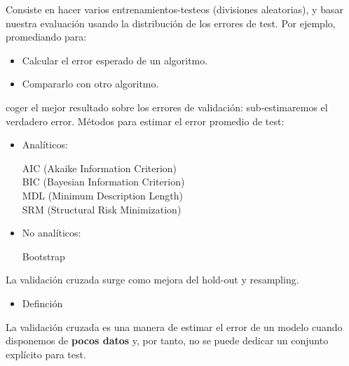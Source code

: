 Consiste en hacer varios entrenamientos-testeos (divisiones aleatorias), y basar nuestra evaluación usando la distribución de los errores de test. Por ejemplo, promediando para:
\begin{itemize}
	\item Calcular el error esperado de un algoritmo.
	\item Compararlo con otro algoritmo.
\end{itemize}
 coger el mejor resultado sobre los errores de validación: sub-estimaremos el verdadero error.
Métodos para estimar el error promedio de test:
\begin{itemize}
	\item Analíticos:
	
	AIC (Akaike Information Criterion)\\
	BIC (Bayesian Information Criterion)\\
	MDL (Minimum Description Length)\\
	SRM (Structural Risk Minimization)\\
	\item No analíticos:
	
	
	Bootstrap
\end{itemize}
La validación cruzada surge como mejora del hold-out y resampling.
\begin{itemize}[label=\color{red}\textbullet, leftmargin=*]
	\item \color{lightblue}Definción
\end{itemize}
La validación cruzada es una manera de estimar el error de un modelo cuando disponemos de \textbf{pocos datos} y, por tanto, no se puede dedicar un conjunto explícito para test.

